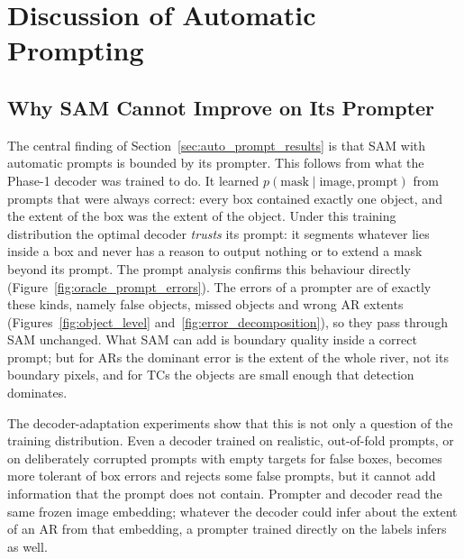 
\section{Discussion of Automatic Prompting}
\label{sec:discussion_prompting}

\subsection{Why SAM Cannot Improve on Its Prompter}

The central finding of Section~\ref{sec:auto_prompt_results} is that SAM with automatic prompts is bounded by its
prompter. This follows from what the Phase-1 decoder was trained to do. It learned
$p(\text{mask}\mid\text{image},\text{prompt})$ from prompts that were always correct: every box contained exactly one
object, and the extent of the box was the extent of the object. Under this training distribution the optimal decoder
\emph{trusts} its prompt: it segments whatever lies inside a box and never has a reason to output nothing or to extend
a mask beyond its prompt. The prompt analysis confirms this behaviour directly (Figure~\ref{fig:oracle_prompt_errors}).
The errors of a prompter are of exactly these kinds, namely false objects, missed objects and wrong AR extents
(Figures~\ref{fig:object_level} and~\ref{fig:error_decomposition}), so they pass through SAM unchanged. What SAM can add
is boundary quality inside a correct prompt; but for ARs the dominant error is the extent of the whole river, not its
boundary pixels, and for TCs the objects are small enough that detection dominates.

The decoder-adaptation experiments show that this is not only a question of the training distribution. Even a decoder
trained on realistic, out-of-fold prompts, or on deliberately corrupted prompts with empty targets for false boxes,
becomes more tolerant of box errors and rejects some false prompts, but it cannot add information that the prompt does
not contain. Prompter and decoder read the same frozen image embedding; whatever the decoder could infer
about the extent of an AR from that embedding, a prompter trained directly on the labels infers as well.

